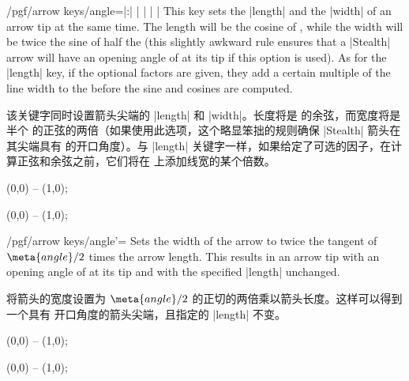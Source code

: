 \begin{key}{/pgf/arrow keys/angle=|:|%
        | |%
        | |}
    This key sets the |length| and the |width| of an arrow tip at the same
    time. The length will be the cosine of , while the width will
    be twice the sine of half the  (this slightly awkward rule
    ensures that a |Stealth| arrow will have an opening angle of 
    at its tip if this option is used). As for the |length| key, if the
    optional factors are given, they add a certain multiple of the line width
    to the  before the sine and cosines are computed.
    
    该关键字同时设置箭头尖端的 |length| 和 |width|。长度将是  的余弦，而宽度将是半个  的正弦的两倍（如果使用此选项，这个略显笨拙的规则确保 |Stealth| 箭头在其尖端具有  的开口角度）。与 |length| 关键字一样，如果给定了可选的因子，在计算正弦和余弦之前，它们将在  上添加线宽的某个倍数。
\begin{codeexample}[preamble={\usetikzlibrary{arrows.meta}}]
\tikz \draw [arrows = {-Stealth[inset=0pt, angle=90:10pt]}] (0,0) -- (1,0);
\end{codeexample}
\begin{codeexample}[preamble={\usetikzlibrary{arrows.meta}}]
\tikz \draw [arrows = {-Stealth[inset=0pt, angle=30:10pt]}] (0,0) -- (1,0);
\end{codeexample}
\end{key}

\begin{key}{/pgf/arrow keys/angle'=}
    Sets the width of the arrow to twice the tangent of $\meta{angle}/2$ times
    the arrow length. This results in an arrow tip with an opening angle of
     at its tip and with the specified |length| unchanged.
    
    将箭头的宽度设置为 $\meta{angle}/2$ 的正切的两倍乘以箭头长度。这样可以得到一个具有  开口角度的箭头尖端，且指定的 |length| 不变。

\begin{codeexample}[preamble={\usetikzlibrary{arrows.meta}}]
\tikz \draw [arrows = {-Stealth[inset=0pt, length=10pt, angle'=90]}]
            (0,0) -- (1,0);
\end{codeexample}
\begin{codeexample}[preamble={\usetikzlibrary{arrows.meta}}]
\tikz \draw [arrows = {-Stealth[inset=0pt, length=10pt, angle'=30]}]
            (0,0) -- (1,0);
\end{codeexample}
\end{key}


